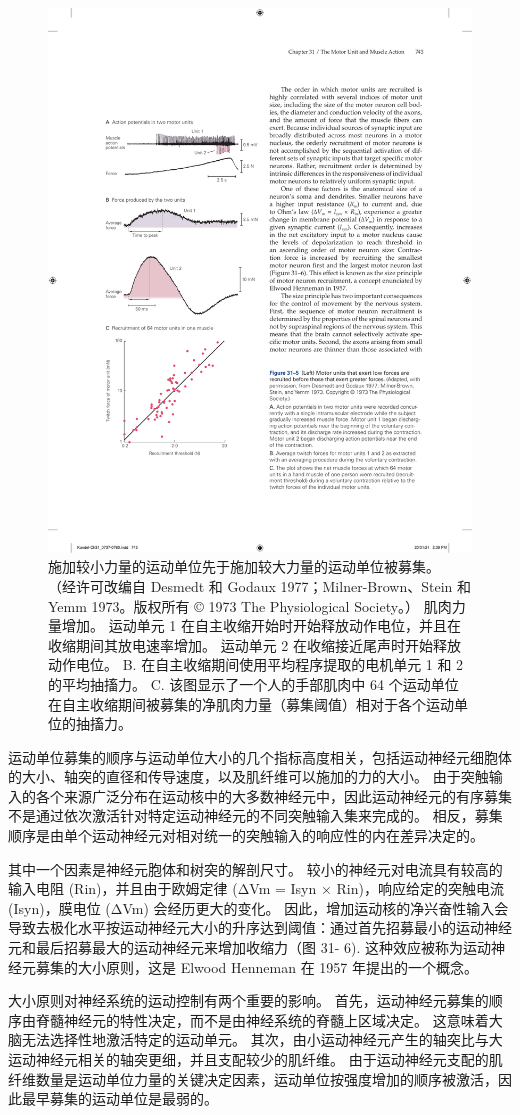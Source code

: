 \begin{figure}[htbp]
	\centering
	\includegraphics[width=0.5\linewidth]{chap31/fig_31_5}
	\caption{施加较小力量的运动单位先于施加较大力量的运动单位被募集。 （经许可改编自 Desmedt 和 Godaux 1977；Milner-Brown、Stein 和 Yemm 1973。版权所有 © 1973 The Physiological Society。） 肌肉力量增加。 运动单元 1 在自主收缩开始时开始释放动作电位，并且在收缩期间其放电速率增加。 运动单元 2 在收缩接近尾声时开始释放动作电位。 B. 在自主收缩期间使用平均程序提取的电机单元 1 和 2 的平均抽搐力。 C. 该图显示了一个人的手部肌肉中 64 个运动单位在自主收缩期间被募集的净肌肉力量（募集阈值）相对于各个运动单位的抽搐力。}
	\label{fig:31_5}
\end{figure}

运动单位募集的顺序与运动单位大小的几个指标高度相关，包括运动神经元细胞体的大小、轴突的直径和传导速度，以及肌纤维可以施加的力的大小。 由于突触输入的各个来源广泛分布在运动核中的大多数神经元中，因此运动神经元的有序募集不是通过依次激活针对特定运动神经元的不同突触输入集来完成的。 相反，募集顺序是由单个运动神经元对相对统一的突触输入的响应性的内在差异决定的。

其中一个因素是神经元胞体和树突的解剖尺寸。 较小的神经元对电流具有较高的输入电阻 (Rin)，并且由于欧姆定律 (ΔVm = Isyn × Rin)，响应给定的突触电流 (Isyn)，膜电位 (ΔVm) 会经历更大的变化。 因此，增加运动核的净兴奋性输入会导致去极化水平按运动神经元大小的升序达到阈值：通过首先招募最小的运动神经元和最后招募最大的运动神经元来增加收缩力（图 31- 6). 这种效应被称为运动神经元募集的大小原则，这是 Elwood Henneman 在 1957 年提出的一个概念。

大小原则对神经系统的运动控制有两个重要的影响。 首先，运动神经元募集的顺序由脊髓神经元的特性决定，而不是由神经系统的脊髓上区域决定。 这意味着大脑无法选择性地激活特定的运动单元。 其次，由小运动神经元产生的轴突比与大运动神经元相关的轴突更细，并且支配较少的肌纤维。 由于运动神经元支配的肌纤维数量是运动单位力量的关键决定因素，运动单位按强度增加的顺序被激活，因此最早募集的运动单位是最弱的。

